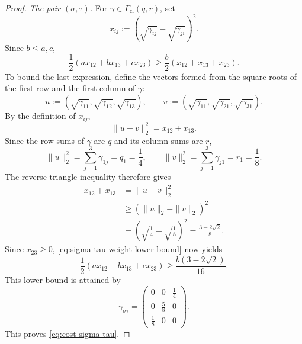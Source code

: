 \documentclass[11pt]{article}
\begin{document}
\begin{proof}
    \smallskip
    \noindent\emph{The pair $(\sigma,\tau)$.}
    For $\gamma\in\Gamma_{\mathrm{cl}}(q,r)$, set
    \[
        x_{ij}:=
        \left(\sqrt{\gamma_{ij}}-\sqrt{\gamma_{ji}}\right)^2.
    \]
    Since $b\leq a,c$,
    \begin{equation}\label{eq:sigma-tau-weight-lower-bound}
        \frac12(ax_{12}+bx_{13}+cx_{23})
        \geq\frac b2(x_{12}+x_{13}+x_{23}).
    \end{equation}
    To bound the last expression, define the vectors formed from the square
    roots of the first row and the first column of $\gamma$:
    \[
        u:=\left(\sqrt{\gamma_{11}},\sqrt{\gamma_{12}},
                  \sqrt{\gamma_{13}}\right),
        \qquad
        v:=\left(\sqrt{\gamma_{11}},\sqrt{\gamma_{21}},
                  \sqrt{\gamma_{31}}\right).
    \]
    By the definition of $x_{ij}$,
    \[
        \|u-v\|_2^2=x_{12}+x_{13}.
    \]
    Since the row sums of $\gamma$ are $q$ and its column sums are $r$,
    \[
        \|u\|_2^2=\sum_{j=1}^3\gamma_{1j}=q_1=\frac14,
        \qquad
        \|v\|_2^2=\sum_{j=1}^3\gamma_{j1}=r_1=\frac18.
    \]
    The reverse triangle inequality therefore gives
    \begin{align*}
        x_{12}+x_{13}
        &=\|u-v\|_2^2\\
        &\geq\left(\|u\|_2-\|v\|_2\right)^2\\
        &=\left(\sqrt{\frac14}-\sqrt{\frac18}\right)^2
          =\frac{3-2\sqrt2}{8}.
    \end{align*}
    Since $x_{23}\geq0$, \eqref{eq:sigma-tau-weight-lower-bound} now yields
    \[
        \frac12(ax_{12}+bx_{13}+cx_{23})
        \geq \frac{b(3-2\sqrt2)}{16}.
    \]
    This lower bound is attained by
    \begin{equation}\label{eq:optimal-coupling-sigma-tau}
        \gamma_{\sigma\tau}=
        \begin{pmatrix}
            0&0&\frac14\\
            0&\frac58&0\\
            \frac18&0&0
        \end{pmatrix}.
    \end{equation}
    This proves \eqref{eq:cost-sigma-tau}.


\end{proof}
\end{document}
